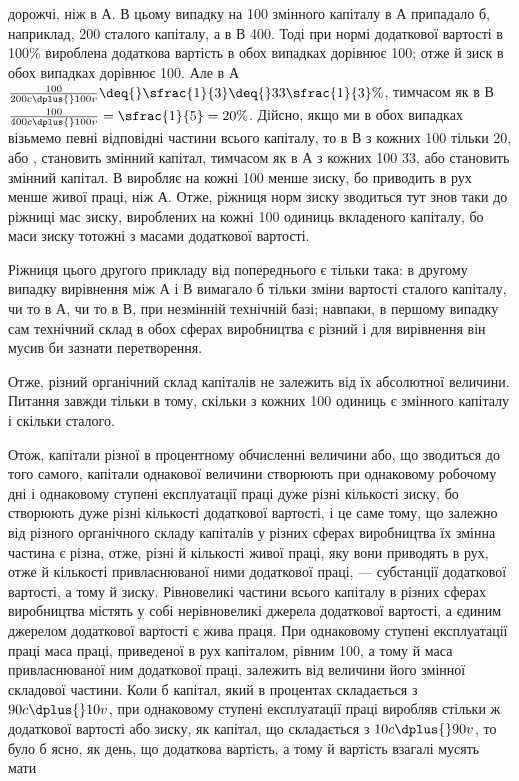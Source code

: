 \parcont{}  %
дорожчі, ніж в $А$. В цьому випадку на 100
змінного капіталу в $А$ припадало б, наприклад, 200 сталого капіталу, а в $В$ 400. Тоді при нормі додаткової вартості в 100\% вироблена
додаткова вартість в обох випадках дорівнює 100; отже й зиск в обох випадках
дорівнює 100. Але в $А$ $\frac{100}{200 c \dplus{} 100 v} \deq{}
\sfrac{1}{3} \deq{} 33\sfrac{1}{3}\%$, тимчасом як в $В$ $\frac{100}{400 c \dplus{} 100 v }= \sfrac{1}{5}=20\%$. Дійсно,
якщо ми в обох випадках візьмемо певні відповідні частини
всього капіталу, то в $В$ з кожних 100 тільки
20, або , становить змінний капітал, тимчасом як в $А$ з кожних 100 33, або  становить змінний капітал. $В$ виробляє на кожні 100 менше зиску, бо приводить в рух менше
живої праці, ніж $А$. Отже, ріжниця норм зиску зводиться тут
знов таки до ріжниці мас зиску, вироблених на кожні 100 одиниць вкладеного капіталу, бо маси зиску
тотожні з масами додаткової вартості.

Ріжниця цього другого прикладу від попереднього є тільки
така: в другому випадку вирівнення між $А$ і $В$ вимагало б тільки
зміни вартості сталого капіталу, чи то в $А$, чи то в $В$, при незмінній технічній базі; навпаки, в
першому випадку сам технічний склад в обох сферах виробництва є різний і для вирівнення він мусив би
зазнати перетворення.

Отже, різний органічний склад капіталів не залежить від їх
абсолютної величини. Питання завжди тільки в тому, скільки
з кожних 100 одиниць є змінного капіталу і скільки сталого.

Отож, капітали різної в процентному обчисленні величини
або, що зводиться до того самого, капітали однакової величини
створюють при однаковому робочому дні і однаковому ступені
експлуатації праці дуже різні кількості зиску, бо створюють
дуже різні кількості додаткової вартості, і це саме тому, що
залежно від різного органічного складу капіталів у різних сферах виробництва їх змінна частина є
різна, отже, різні й кількості живої праці, яку вони приводять в рух, отже й кількості
привласнюваної ними додаткової праці, — субстанції додаткової
вартості, а тому й зиску. Рівновеликі частини всього капіталу
в різних сферах виробництва містять у собі нерівновеликі джерела додаткової вартості, а єдиним
джерелом додаткової вартості є жива праця. При однаковому ступені експлуатації праці маса праці,
приведеної в рух капіталом, рівним 100, а тому й
маса привласнюваної ним додаткової праці, залежить від величини
його змінної складової частини. Коли б капітал, який в процентах складається з $90 c \dplus{} 10 v$, при
однаковому ступені експлуатації праці виробляв стільки ж додаткової вартості або зиску, як капітал,
що складається з $10 c \dplus{} 90 v$, то було б ясно, як день,
що додаткова вартість, а тому й вартість взагалі мусять мати
\parbreak{}  %
